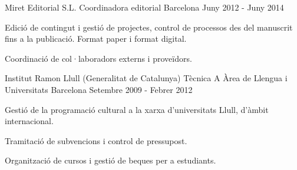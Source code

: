 \begin{cventries}
  \cventry
    {Miret Editorial S.L.} %
    {Coordinadora editorial} %
    {Barcelona} %
    {Juny 2012 - Juny 2014} %
    {
      \begin{cvitems} %
        \item {Edició de contingut i gestió de projectes, control de processos des del manuscrit fins a la publicació. Format paper i format digital.}
        \item {Coordinació de col·laboradors externs i proveïdors.}
      \end{cvitems}
    }

  \cventry
    {Institut Ramon Llull (Generalitat de Catalunya)} %
    {Tècnica A Àrea de Llengua i Universitats} %
    {Barcelona} %
    {Setembre 2009 - Febrer 2012} %
    {
      \begin{cvitems} %
        \item {Gestió de la programació cultural a la xarxa d'universitats Llull, d'àmbit internacional.}
        \item {Tramitació de subvencions i control de pressupost.}
        \item {Organització de cursos i gestió de beques per a estudiants.}
      \end{cvitems}
    }
\end{cventries}
